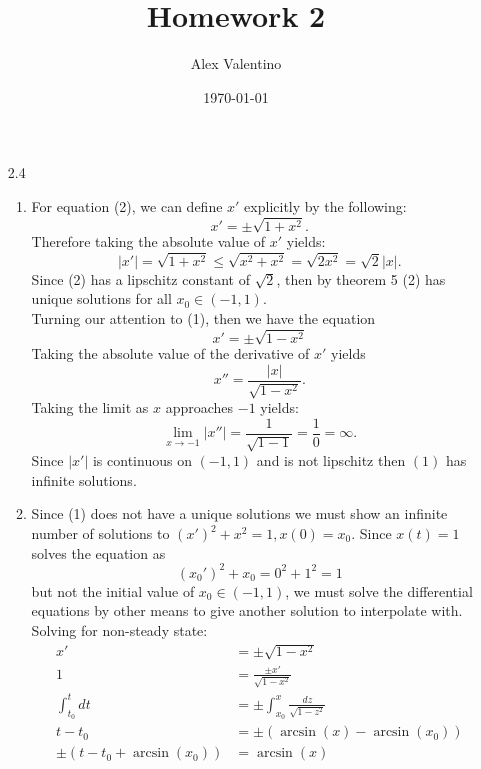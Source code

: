 \documentclass[12pt, letterpaper]{article}
\date{\today}
\author{Alex Valentino}
\title{Homework 2}
\begin{document}
\begin{enumerate}
	\item[2.4] 
	\begin{enumerate}
		\item For equation (2), we can define $x'$ explicitly by the following:
		\begin{equation*}
		x' = \pm \sqrt{1+x^2}.
		\end{equation*}		 
		Therefore taking the absolute value of $x'$ yields:
		\begin{equation*} |x'| = \sqrt{1+x^2} \leq \sqrt{x^2 + x^2} = \sqrt{2x^2} = \sqrt{2}|x|.
		\end{equation*}		 
		Since (2) has a lipschitz constant of $\sqrt{2}$, then by theorem 5 (2) has unique solutions for all $x_0 \in (-1,1)$.\\
		Turning our attention to (1), then we have the equation 
		\begin{equation*}
			x' = \pm \sqrt{1-x^2}
		\end{equation*}
		Taking the absolute value of the derivative of $x'$ yields 
		\begin{equation*}
		x'' = \frac{|x|}{\sqrt{1-x^2}}.
		\end{equation*}
		Taking the limit as $x$ approaches $-1$ yields:
		\begin{equation*}
		\lim_{x \to -1} |x''| = \frac{1}{\sqrt{1 - 1}} = \frac{1}{0} = \infty.
		\end{equation*}
		Since $|x'|$ is continuous on $(-1,1)$ and is not lipschitz then $(1)$ has infinite solutions.  
		\item Since (1) does not have a unique solutions we must show an infinite number of solutions to $(x')^2 + x^2 = 1, x(0) = x_0$.  Since $x(t) = 1$ solves the equation as 
		\begin{equation*}
		(x_0')^2 + x_0 = 0^2 + 1^2 = 1
		\end{equation*}
		but not the initial value of $x_0 \in (-1,1)$, we must solve the differential equations by other means to give another solution to interpolate with.\\
		Solving for non-steady state:
		\begin{align*}
			x' &= \pm \sqrt{1-x^2}\\
			1 &= \frac{\pm x'}{\sqrt{1-x^2}}\\
			\int_{t_0}^t dt &= \pm \int_{x_0}^x \frac{dz}{\sqrt{1-z^2}}\\
			t - t_0 &= \pm(\arcsin(x) - \arcsin(x_0))\\
			\pm (t-t_0 + \arcsin(x_0)) &= \arcsin(x)\\

\end{align*}
\end{enumerate}
\end{enumerate}
\end{document}

